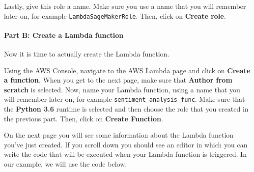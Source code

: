 \documentclass[11pt]{article}
\begin{document}
Lastly, give this role a name. Make sure you use a name that you will
remember later on, for example \texttt{LambdaSageMakerRole}. Then, click
on \textbf{Create role}.

\hypertarget{part-b-create-a-lambda-function}{%
\paragraph{Part B: Create a Lambda
function}\label{part-b-create-a-lambda-function}}

Now it is time to actually create the Lambda function.

Using the AWS Console, navigate to the AWS Lambda page and click on
\textbf{Create a function}. When you get to the next page, make sure
that \textbf{Author from scratch} is selected. Now, name your Lambda
function, using a name that you will remember later on, for example
\texttt{sentiment\_analysis\_func}. Make sure that the \textbf{Python
3.6} runtime is selected and then choose the role that you created in
the previous part. Then, click on \textbf{Create Function}.

On the next page you will see some information about the Lambda function
you've just created. If you scroll down you should see an editor in
which you can write the code that will be executed when your Lambda
function is triggered. In our example, we will use the code below.
\end{document}

